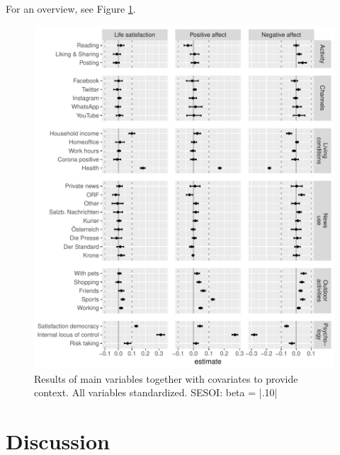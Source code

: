 \documentclass[
  man,mask,floatsintext]{apa7}
\begin{document}
For an overview, see Figure \ref{fig:fig-control}.

\begin{figure}
\includegraphics[width=\textwidth]{manuscript_files/figure-latex/fig-control-1} \caption{Results of main variables together with covariates to provide context. All variables standardized. SESOI: beta = |.10|}\label{fig:fig-control}
\end{figure}

\hypertarget{discussion}{%
\section{Discussion}\label{discussion}}
\end{document}
